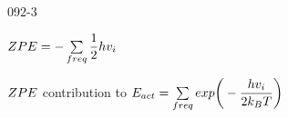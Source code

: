 \begin{mitframe}{092-3}
        \begin{listtwo}
        		\item $\compress\p\energy=-\sum\limits_{freq}\dfrac{1}{2}\heattranscoeff\vvel_{\state}$
                \item $\compress\p\energy$ contribution to $\energy_{act}=\sum\limits_{freq}exp\bigg(-\dfrac{\heattranscoeff\vvel_{\state}}{2\thermcond_{\exergy}\Temp}\bigg)$
        \end{listtwo}
\end{mitframe}